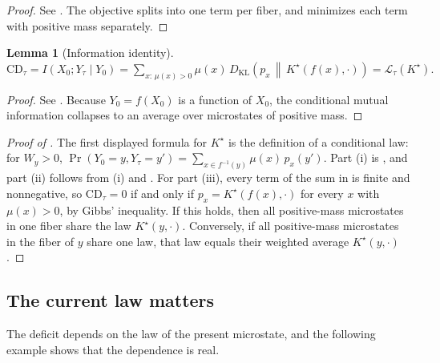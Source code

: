 \documentclass[11pt]{article}
\newtheorem{lemma}{Lemma}[section]
\theoremstyle{definition}
\newcommand{\1}{\mathbf{1}}
\newcommand{\DKL}[2]{D_{\mathrm{KL}}\!\left(#1\,\middle\|\,#2\right)}
\begin{document}
\begin{proof}
See . The objective splits into one term per fiber, and  minimizes each term with positive mass separately.
\end{proof}

\begin{lemma}[Information identity]\label{lem:closure_cmi_identity}
$\displaystyle \mathrm{CD}_\tau=I(X_0;Y_\tau\mid Y_0)=\sum_{x:\,\mu(x)>0}\mu(x)\,\DKL{p_x}{K^\star(f(x),\cdot)}=\mathcal{L}_\tau(K^\star).$
\end{lemma}

\begin{proof}
See . Because $Y_0=f(X_0)$ is a function of $X_0$, the conditional mutual information collapses to an average over microstates of positive mass.
\end{proof}

\begin{proof}[Proof of ]
The first displayed formula for $K^\star$ is the definition of a conditional law: for $W_y>0$,
$\Pr(Y_0=y,Y_\tau=y')=\sum_{x\in f^{-1}(y)}\mu(x)\,p_x(y')$.
Part (i) is , and part (ii) follows from (i) and .
For part (iii), every term of the sum in  is finite and nonnegative, so $\mathrm{CD}_\tau=0$ if and only if $p_x=K^\star(f(x),\cdot)$ for every $x$ with $\mu(x)>0$, by Gibbs' inequality.
If this holds, then all positive-mass microstates in one fiber share the law $K^\star(y,\cdot)$.
Conversely, if all positive-mass microstates in the fiber of $y$ share one law, that law equals their weighted average $K^\star(y,\cdot)$.
\end{proof}

\subsection{The current law matters}

The deficit depends on the law of the present microstate, and the following example shows that the dependence is real.
\end{document}
